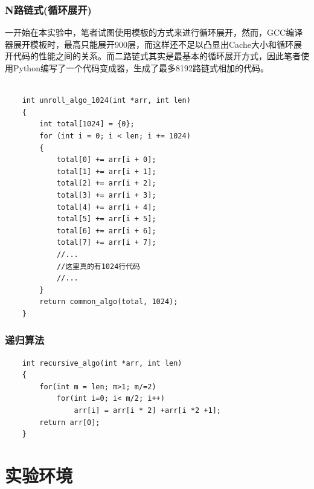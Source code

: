 \documentclass[a4paper]{article}
\begin{document}
\subsubsection{N路链式(循环展开)}
一开始在本实验中，笔者试图使用模板的方式来进行循环展开，然而，GCC编译器展开模板时，最高只能展开900层，而这样还不足以凸显出Cache大小和循环展开代码的性能之间的关系。而二路链式其实是最基本的循环展开方式，因此笔者使用Python编写了一个代码变成器，生成了最多8192路链式相加的代码。
\begin{verbatim}

    int unroll_algo_1024(int *arr, int len)
    {
        int total[1024] = {0};
        for (int i = 0; i < len; i += 1024)
        {
            total[0] += arr[i + 0];
            total[1] += arr[i + 1];
            total[2] += arr[i + 2];
            total[3] += arr[i + 3];
            total[4] += arr[i + 4];
            total[5] += arr[i + 5];
            total[6] += arr[i + 6];
            total[7] += arr[i + 7];
            //...
            //这里真的有1024行代码
            //...
        }
        return common_algo(total, 1024);
    }
\end{verbatim}

\subsubsection{递归算法}
\begin{verbatim}
    int recursive_algo(int *arr, int len)
    {
        for(int m = len; m>1; m/=2)
            for(int i=0; i< m/2; i++)
                arr[i] = arr[i * 2] +arr[i *2 +1];
        return arr[0];
    }
\end{verbatim}


\section{实验环境}
\end{document}
